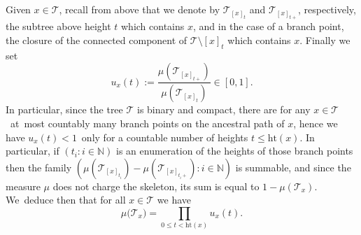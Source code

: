 \documentclass[11pt]{article}
\newcommand{\T}{\mathcal{T}}\let\CRT\T\let\tbr\T
\newcommand{\h}{\mathrm{ht}}
\theoremstyle{definition}
\begin{document}
Given $x \in \T$, recall from above that we denote by $ \mathcal{T}_{[x]_t}$ and $\mathcal{T}_{[x]_{t+}}$, respectively, the subtree above height $t$ which contains $x$, and in the case of a branch point, the closure of the connected component of $\T\setminus{[x]_t}$ which contains $x$. Finally we set
\[
u_x(t) := \frac{\mu(\T_{[x]_{t+}})}{ \mu(\T_{[x]_t})} \in [0,1].
\]
In particular, since the tree $ \mathcal{T}$ is binary and compact, there are for any \hbox{$x \in \T$}~at~most countably many branch points on the ancestral path of $x$, hence we have \hbox{$u_x(t) < 1$}~only for a countable number of heights $t \leq \h(x)$. In particular, if $(t_i : i \in \mathbb{N})$ is an enumeration of the heights of those branch points then the family \hbox{$ (\mu(\mathcal{T}_{[x]_{t_i}})-\mu(\mathcal{T}_{[x]_{t_i +}}): i \in \mathbb{N})$} is summable, and since the measure $\mu$ does not charge the skeleton, its sum is equal to $1- \mu(\mathcal{T}_x)$. We~deduce then that for all $x \in \T$ we have
\begin{equation} \mu\big(\T_x\big) = \prod_{0 \leq t < \h(x)} u_x(t). \label{eq:noloss}\end{equation}
\end{document}
